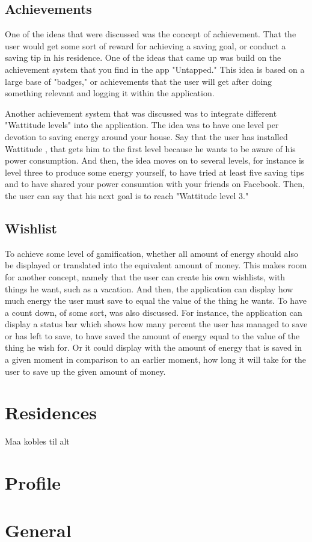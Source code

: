 \subsection{Achievements}
One of the ideas that were discussed was the concept of achievement. That the user would get some sort of reward for achieving a saving goal, or conduct a saving tip in his residence. One of the ideas that came up was build on the achievement system that you find in the app "Untapped." 
This idea is based on a large base of "badges," or achievements that the user will get after doing something relevant and logging it within the application. 

Another achievement system that was discussed was to integrate different "Wattitude levels" into the application. The idea was to have one level per devotion to saving energy around your house. Say that the user has installed Wattitude , that gets him to the first level because he wants to be aware of his power consumption. And then, the idea moves on to several levels, for instance is level three to produce some energy yourself, to have tried at least five saving tips and to have shared your power consumtion with your friends on Facebook.  Then, the user can say that his next goal is to reach "Wattitude level 3." 

\subsection{Wishlist}
To achieve some level of gamification, whether all amount of energy should also be displayed or translated into the equivalent amount of money. This makes room for another concept, namely that the user can create his own wishlists, with things he want, such as a vacation. And then, the application can display how much energy the user must save to equal the value of the thing he wants. To have a count down, of some sort, was also discussed. For instance, the application can display a status bar  which shows how many percent the user has managed to save or has left to save, to have saved the amount of energy equal to the value of the thing he wish for. Or it could display with the amount of energy that is saved in a given moment in comparison to an earlier moment, how long it will take for the user to save up the given amount of money.  


\section{Residences}
Maa kobles til alt

\section{Profile}

\section{General}